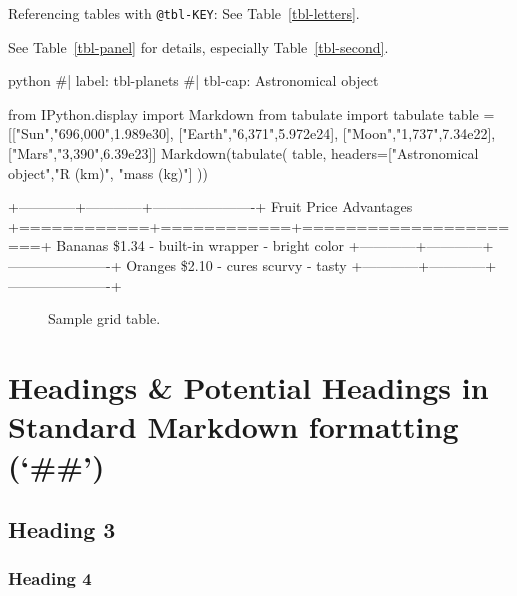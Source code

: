 \documentclass[
  11pt,
  letterpaper,
]{book}
\newenvironment{Shaded}{\begin{snugshade}}{\end{snugshade}}
\newcommand{\CommentTok}[1]{\textcolor[rgb]{0.37,0.37,0.37}{#1}}
\newcommand{\NormalTok}[1]{\textcolor[rgb]{0.00,0.23,0.31}{#1}}
\newcommand{\OtherTok}[1]{\textcolor[rgb]{0.00,0.23,0.31}{#1}}
\begin{document}
Referencing tables with \texttt{@tbl-KEY}: See Table~\ref{tbl-letters}.

See Table~\ref{tbl-panel} for details, especially
Table~\ref{tbl-second}.

\begin{Shaded}
\begin{Highlighting}[]
\NormalTok{python}
\NormalTok{\#| label: tbl{-}planets}
\NormalTok{\#| tbl{-}cap: Astronomical object}

\NormalTok{from IPython.display import Markdown}
\NormalTok{from tabulate import tabulate}
\NormalTok{table = [}\CommentTok{[}\OtherTok{"Sun","696,000",1.989e30}\CommentTok{]}\NormalTok{,}
         \CommentTok{[}\OtherTok{"Earth","6,371",5.972e24}\CommentTok{]}\NormalTok{,}
         \CommentTok{[}\OtherTok{"Moon","1,737",7.34e22}\CommentTok{]}\NormalTok{,}
         \CommentTok{[}\OtherTok{"Mars","3,390",6.39e23}\CommentTok{]}\NormalTok{]}
\NormalTok{Markdown(tabulate(}
\NormalTok{  table, }
\NormalTok{  headers=}\CommentTok{[}\OtherTok{"Astronomical object","R (km)", "mass (kg)"}\CommentTok{]}
\NormalTok{))}
\end{Highlighting}
\end{Shaded}

\begin{description}
\item[+------------+------------+----------------------+ \textbar{}
Fruit \textbar{} Price \textbar{} Advantages \textbar{}
+============+============+======================+ \textbar{} Bananas
\textbar{} \$1.34 \textbar{} - built-in wrapper \textbar{} \textbar{}
\textbar{} \textbar{} - bright color \textbar{}
+------------+------------+----------------------+ \textbar{} Oranges
\textbar{} \$2.10 \textbar{} - cures scurvy \textbar{} \textbar{}
\textbar{} \textbar{} - tasty \textbar{}
+------------+------------+----------------------+]
Sample grid table.
\end{description}

\section{Headings \& Potential Headings in Standard Markdown formatting
(`\#\#')}\label{sec-heading}

\subsection{Heading 3}\label{heading-3-1}

\subsubsection{Heading 4}\label{heading-4-1}
\end{document}
